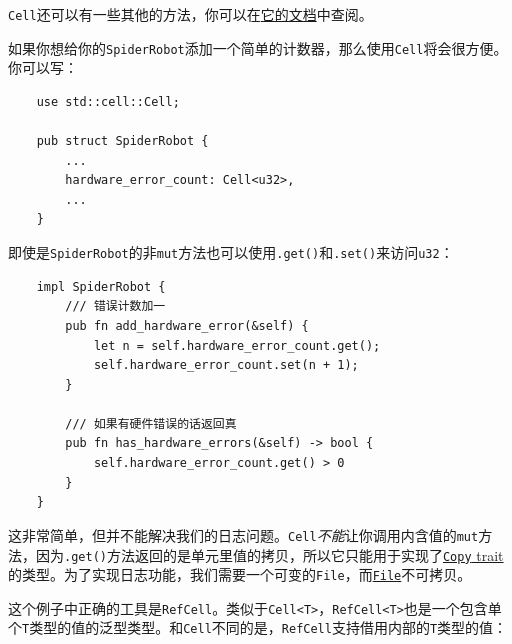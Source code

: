 \texttt{Cell}还可以有一些其他的方法，你可以在\href{https://doc.rust-lang.org/std/cell/struct.Cell.html}{它的文档}中查阅。

如果你想给你的\texttt{SpiderRobot}添加一个简单的计数器，那么使用\texttt{Cell}将会很方便。你可以写：
\begin{verbatim}
    use std::cell::Cell;

    pub struct SpiderRobot {
        ...
        hardware_error_count: Cell<u32>,
        ...
    }
\end{verbatim}

即使是\texttt{SpiderRobot}的非\texttt{mut}方法也可以使用\texttt{.get()}和\texttt{.set()}来访问\texttt{u32}：
\begin{verbatim}
    impl SpiderRobot {
        /// 错误计数加一
        pub fn add_hardware_error(&self) {
            let n = self.hardware_error_count.get();
            self.hardware_error_count.set(n + 1);
        }

        /// 如果有硬件错误的话返回真
        pub fn has_hardware_errors(&self) -> bool {
            self.hardware_error_count.get() > 0
        }
    }
\end{verbatim}

这非常简单，但并不能解决我们的日志问题。\texttt{Cell}\emph{不能}让你调用内含值的\texttt{mut}方法，因为\texttt{.get()}方法返回的是单元里值的拷贝，所以它只能用于实现了\hyperref[copy]{\texttt{Copy} trait}的类型。为了实现日志功能，我们需要一个可变的\texttt{File}，而\hyperref[file]{\texttt{File}}不可拷贝。

这个例子中正确的工具是\texttt{RefCell}。类似于\texttt{Cell<T>}，\texttt{RefCell<T>}也是一个包含单个\texttt{T}类型的值的泛型类型。和\texttt{Cell}不同的是，\texttt{RefCell}支持借用内部的\texttt{T}类型的值：





